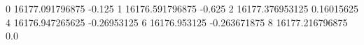 0 16177.091796875 -0.125
1 16176.591796875 -0.625
2 16177.376953125 0.16015625
4 16176.947265625 -0.26953125
6 16176.953125 -0.263671875
8 16177.216796875 0.0
